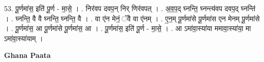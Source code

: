 \documentclass[17pt]{extarticle}
\begin{document}
53. पू॒र्णमा॑स॒ इति॑ पू॒र्ण - मा॒से॒ । . निर॑वप दवप॒न् निर् णिर॑वपत् । . अ॒व॒प॒द् घ्नन्ति॒ घ्नन्त्य॑वप दवप॒द् घ्नन्ति॑ । . घ्नन्ति॒ वै वै घ्नन्ति॒ घ्नन्ति॒ वै । . वा ए॑न मेनं॒ ॅवै वा ए॑नम् । . ए॒न॒म् पू॒र्णमा॑से पू॒र्णमा॑स एन मेनम् पू॒र्णमा॑से । . पू॒र्णमा॑स॒ आ पू॒र्णमा॑से पू॒र्णमा॑स॒ आ । . पू॒र्णमा॑स॒ इति॑ पू॒र्ण - मा॒से॒ । . आ ऽमा॑वा॒स्या॑या ममावा॒स्या॑या॒ मा ऽमा॑वा॒स्या॑याम् । \newline

\textbf{Ghana Paata } \newline
\end{document}
